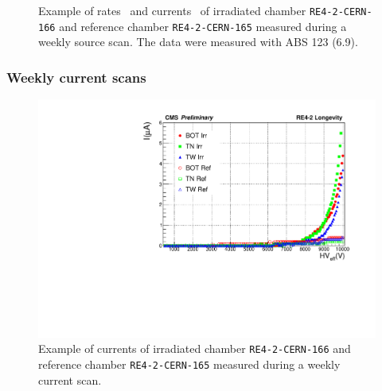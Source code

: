 \begin{figure}[H]
\begin{subfigure}{0.5\linewidth}
        	\caption{\label{fig:weekly-source:B}}
    	\end{subfigure}
		\caption{\label{fig:weekly-source} Example of rates~ and currents~ of irradiated chamber \texttt{RE4-2-CERN-166} and reference chamber \texttt{RE4-2-CERN-165} measured during a weekly source scan. The data were measured with ABS 123 (6.9).}
	\end{figure}
	
		\subsubsection{Weekly current scans}
		\label{chapt5:sssec:currentscan}
	
\begingroup\setlength{\intextsep}{0pt}\setlength{\columnsep}{15pt}
	
	\begin{figure}
		\centering
    	\includegraphics[width = \linewidth]{fig/chapt5/Weekly-current-Scan.pdf}
		\caption{\label{fig:weekly-current} Example of currents of irradiated chamber \texttt{RE4-2-CERN-166} and reference chamber \texttt{RE4-2-CERN-165} measured during a weekly current scan.}
	\end{figure}
		
